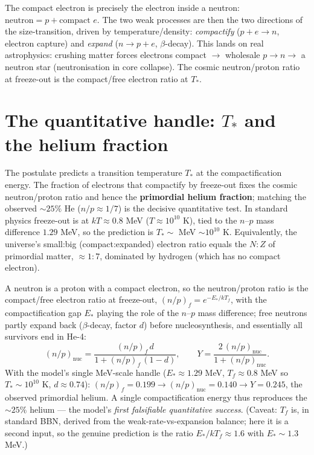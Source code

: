 \documentclass[11pt]{article}
\begin{document}
The compact electron is precisely the electron inside a neutron: $\text{neutron}=p+\text{compact }e$.
The two weak processes are then the two directions of the size-transition, driven by
temperature/density: \emph{compactify} ($p+e\to n$, electron capture) and \emph{expand}
($n\to p+e$, $\beta$-decay). This lands on real astrophysics: crushing matter forces electrons
compact $\to$ wholesale $p\to n \to$ a neutron star (neutronisation in core collapse). The cosmic
neutron/proton ratio at freeze-out is the compact/free electron ratio at $T_\ast$.

\section{The quantitative handle: $T_\ast$ and the helium fraction}\label{sec:helium}
The postulate predicts a transition temperature $T_\ast$ at the compactification energy. The fraction
of electrons that compactify by freeze-out fixes the cosmic neutron/proton ratio and hence the
\textbf{primordial helium fraction}; matching the observed ${\sim}25\%$ He ($n/p\approx1/7$) is the
decisive quantitative test. In standard physics freeze-out is at $kT\approx0.8$ MeV
($T\approx10^{10}$ K), tied to the $n$--$p$ mass difference $1.29$ MeV, so the prediction is
$T_\ast\sim$ MeV $\sim10^{10}$ K. Equivalently, the universe's small:big (compact:expanded) electron
ratio equals the $N{:}Z$ of primordial matter, ${\approx}1{:}7$, dominated by hydrogen (which has no
compact electron).

A neutron is a proton with a compact electron, so the neutron/proton ratio is the compact/free
electron ratio at freeze-out, $(n/p)_f=e^{-E_\ast/kT_f}$, with the compactification gap $E_\ast$
playing the role of the $n$--$p$ mass difference; free neutrons partly expand back ($\beta$-decay,
factor $d$) before nucleosynthesis, and essentially all survivors end in He-4:
\begin{equation}
(n/p)_{\text{nuc}}=\frac{(n/p)_f\,d}{1+(n/p)_f\,(1-d)},
\qquad
Y=\frac{2\,(n/p)_{\text{nuc}}}{1+(n/p)_{\text{nuc}}} .
\end{equation}
With the model's single MeV-scale handle ($E_\ast\approx1.29$ MeV, $T_f\approx0.8$ MeV so
$T_\ast\sim10^{10}$ K, $d\approx0.74$): $(n/p)_f=0.199\to(n/p)_{\text{nuc}}=0.140\to\boxed{Y=0.245}$,
the observed primordial helium. A single compactification energy thus reproduces the ${\sim}25\%$
helium --- the model's \emph{first falsifiable quantitative success}. (Caveat: $T_f$ is, in standard
BBN, derived from the weak-rate-vs-expansion balance; here it is a second input, so the genuine
prediction is the ratio $E_\ast/kT_f\approx1.6$ with $E_\ast\sim1.3$ MeV.)
\end{document}

